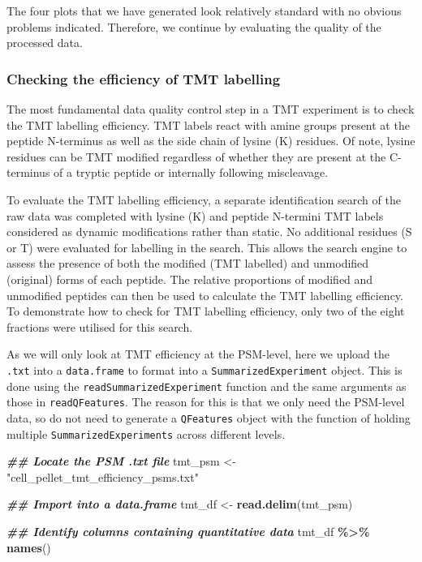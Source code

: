 \documentclass[9pt,a4paper,]{extarticle}
\newenvironment{Shaded}{\begin{snugshade}}{\end{snugshade}}
\newcommand{\DocumentationTok}[1]{\textcolor[rgb]{0.56,0.35,0.01}{\textbf{\textit{#1}}}}
\newcommand{\FunctionTok}[1]{\textcolor[rgb]{0.13,0.29,0.53}{\textbf{#1}}}
\newcommand{\NormalTok}[1]{#1}
\newcommand{\OtherTok}[1]{\textcolor[rgb]{0.56,0.35,0.01}{#1}}
\newcommand{\SpecialCharTok}[1]{\textcolor[rgb]{0.81,0.36,0.00}{\textbf{#1}}}
\newcommand{\StringTok}[1]{\textcolor[rgb]{0.31,0.60,0.02}{#1}}
\begin{document}
The four plots that we have generated look relatively standard with no obvious
problems indicated. Therefore, we continue by evaluating the quality of the
processed data.

\subsubsection{Checking the efficiency of TMT labelling}\label{checking-the-efficiency-of-tmt-labelling}

The most fundamental data quality control step in a TMT experiment is to check
the TMT labelling efficiency. TMT labels react with amine groups present at the
peptide N-terminus as well as the side chain of lysine (K) residues. Of note,
lysine residues can be TMT modified regardless of whether they are present at the
C-terminus of a tryptic peptide or internally following miscleavage.

To evaluate the TMT labelling efficiency, a separate identification search of the
raw data was completed with lysine (K) and peptide N-termini TMT labels
considered as dynamic modifications rather than static. No additional residues
(S or T) were evaluated for labelling in the search. This allows the search
engine to assess the presence of both the modified (TMT labelled) and unmodified
(original) forms of each peptide. The relative proportions of modified and
unmodified peptides can then be used to calculate the TMT labelling efficiency.
To demonstrate how to check for TMT labelling efficiency, only two of the eight
fractions were utilised for this search.

As we will only look at TMT efficiency at the PSM-level, here we upload the \texttt{.txt}
into a \texttt{data.frame} to format into a \texttt{SummarizedExperiment} object. This is done
using the \texttt{readSummarizedExperiment} function and the same arguments as those
in \texttt{readQFeatures}. The reason for this is that we only need the PSM-level data,
so do not need to generate a \texttt{QFeatures} object with the function of holding
multiple \texttt{SummarizedExperiments} across different levels.

\begin{Shaded}
\begin{Highlighting}[]
\DocumentationTok{\#\# Locate the PSM .txt file}
\NormalTok{tmt\_psm }\OtherTok{\textless{}{-}} \StringTok{"cell\_pellet\_tmt\_efficiency\_psms.txt"}

\DocumentationTok{\#\# Import into a data.frame}
\NormalTok{tmt\_df }\OtherTok{\textless{}{-}} \FunctionTok{read.delim}\NormalTok{(tmt\_psm)}

\DocumentationTok{\#\# Identify columns containing quantitative data}
\NormalTok{tmt\_df }\SpecialCharTok{\%\textgreater{}\%}
  \FunctionTok{names}\NormalTok{()}
\end{Highlighting}
\end{Shaded}
\end{document}
